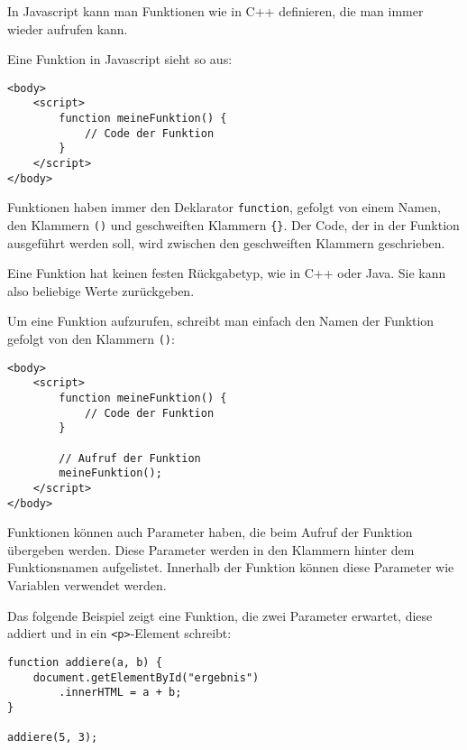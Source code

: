 \documentclass[a4paper,14pt]{extarticle}
\begin{document}


In Javascript kann man Funktionen wie in C++ definieren, die man immer wieder aufrufen kann.

Eine Funktion in Javascript sieht so aus:

\begin{verbatim}
<body>
	<script>
		function meineFunktion() {
			// Code der Funktion
		}
	</script>
</body>
\end{verbatim}

Funktionen haben immer den Deklarator \texttt{function}, gefolgt von einem Namen, den Klammern \texttt{()} und geschweiften Klammern \texttt{\{\}}. Der Code, der in der Funktion ausgeführt werden soll, wird zwischen den geschweiften Klammern geschrieben.

Eine Funktion hat keinen festen Rückgabetyp, wie in C++ oder Java. Sie kann also beliebige Werte zurückgeben.

Um eine Funktion aufzurufen, schreibt man einfach den Namen der Funktion gefolgt von den Klammern \texttt{()}:
\begin{verbatim}
<body>
	<script>
		function meineFunktion() {
			// Code der Funktion
		}

		// Aufruf der Funktion
		meineFunktion();
	</script>
</body>
\end{verbatim}


Funktionen können auch Parameter haben, die beim Aufruf der Funktion übergeben werden. Diese Parameter werden in den Klammern hinter dem Funktionsnamen aufgelistet. Innerhalb der Funktion können diese Parameter wie Variablen verwendet werden.

Das folgende Beispiel zeigt eine Funktion, die zwei Parameter erwartet, diese addiert und in ein \texttt{<p>}-Element schreibt:

\begin{verbatim}
function addiere(a, b) {
	document.getElementById("ergebnis")
		.innerHTML = a + b;
}

addiere(5, 3);
\end{verbatim}
\end{document}
